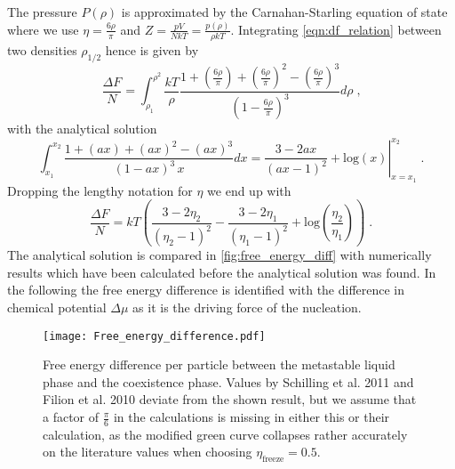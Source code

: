 The pressure $P(\rho)$ is approximated by the Carnahan-Starling equation of state where we use $\eta = \frac{6 \rho }{\pi}$ and $Z=\frac{pV}{NkT} = \frac{p(\rho)}{\rho kT}$. Integrating \autoref{eqn:df_relation} between two densities $\rho_{1/2}$ hence is given by
\begin{equation}
\frac{\Delta F}{N} = \int_{\rho_1}^{\rho^2} \frac{kT}{\rho} \frac{1+\left( \frac{6 \rho}{\pi}\right) +\left( \frac{6 \rho}{\pi}\right)^2 - \left( \frac{6 \rho}{\pi}\right)^3}{\left( 1 - \frac{6 \rho}{\pi}\right)^3} d\rho \; \text{,}
\end{equation}
with the analytical solution
\begin{equation}
\int_{x_1}^{x_2} \frac{1+(ax) +(ax)^2 - (ax)^3 }{( 1 - ax )^3 \,  x} dx = \left. \frac{3-2ax}{(ax-1)^2} + \text{log}(x) \right|_{x=x_1}^{x_2} \; \text{.}
\end{equation}
Dropping the lengthy notation for $\eta$ we end up with
\begin{equation}
\frac{\Delta F}{N} = kT \left(  \frac{3-2 \eta_2}{(\eta_2 - 1)^2} - \frac{3-2 \eta_1}{(\eta_1 - 1)^2} + \text{log}\left( \frac{\eta_2}{\eta_1} \right) \right) \; \text{.}
\end{equation}
The analytical solution is compared in \autoref{fig:free_energy_diff} with numerically results which have been calculated before the analytical solution was found. In the following the free energy difference is identified with the difference in chemical potential $\Delta \mu$ as it is the driving force of the nucleation.\\
\begin{figure}[h]
\centering
\texttt{[image: Free\_energy\_difference.pdf]}
\caption[Free energy difference between fluid and solid phase]{Free energy difference per particle between the metastable liquid phase and the coexistence phase. Values by Schilling et al. 2011\cite{Schilling2011} and Filion et al. 2010\cite{Filion2010a} deviate from the shown result, but we assume that a factor of $\frac{\pi}{6}$ in the calculations is missing in either this or their calculation, as the modified green curve collapses rather accurately on the literature values when choosing $\eta_{\text{freeze}}=0.5$.}
\label{fig:free_energy_diff}
\end{figure}


